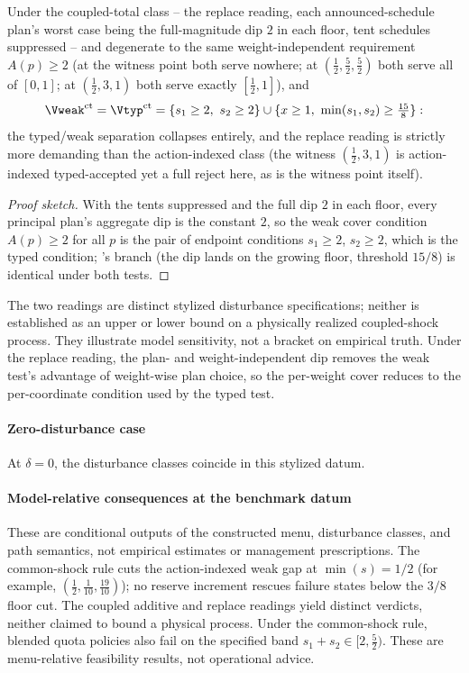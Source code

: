 \begin{theorem}\label{thm:replace}
Under the coupled-total class -- the replace reading, each announced-schedule plan's worst case being the full-magnitude dip $2$ in each floor, tent schedules suppressed --  and  degenerate to the same weight-independent requirement $A(p)\ge2$ (at the witness point both serve nowhere; at $(\tfrac12,\tfrac52,\tfrac52)$ both serve all of $[0,1]$; at $(\tfrac12,3,1)$ both serve exactly $[\tfrac12,1]$), and
\[
\Vweak^{\mathrm{ct}}=\Vtyp^{\mathrm{ct}}=\{s_1\ge2,\ s_2\ge2\}\cup\{x\ge1,\ \min(s_1,s_2)\ge\tfrac{15}8\}:
\]
the typed/weak separation collapses entirely, and the replace reading is strictly more demanding than the action-indexed class (the witness $(\tfrac12,3,1)$ is action-indexed typed-accepted yet a full reject here, as is the witness point itself).
\end{theorem}
\begin{proof}[Proof sketch]
With the tents suppressed and the full dip $2$ in each floor, every principal plan's aggregate dip is the constant $2$, so the weak cover condition $A(p)\ge2$ for all $p$ is the pair of endpoint conditions $s_1\ge2$, $s_2\ge2$, which is the typed condition; 's branch (the dip lands on the growing floor, threshold $15/8$) is identical under both tests.
\end{proof}

The two readings are distinct stylized disturbance specifications; neither is established as an upper or lower bound on a physically realized coupled-shock process. They illustrate model sensitivity, not a bracket on empirical truth. Under the replace reading, the plan- and weight-independent dip removes the weak test's advantage of weight-wise plan choice, so the per-weight cover reduces to the per-coordinate condition used by the typed test.

\paragraph{Zero-disturbance case} At $\delta=0$, the disturbance classes coincide in this stylized datum.

\paragraph{Model-relative consequences at the benchmark datum} These are conditional outputs of the constructed menu, disturbance classes, and path semantics, not empirical estimates or management prescriptions. The common-shock rule cuts the action-indexed weak gap at $\min(s)=1/2$ (for example, $(\tfrac12,\tfrac1{10},\tfrac{19}{10})$); no reserve increment rescues failure states below the $3/8$ floor cut. The coupled additive and replace readings yield distinct verdicts, neither claimed to bound a physical process. Under the common-shock rule, blended quota policies also fail on the specified band $s_1+s_2\in[2,\tfrac52)$. These are menu-relative feasibility results, not operational advice.

